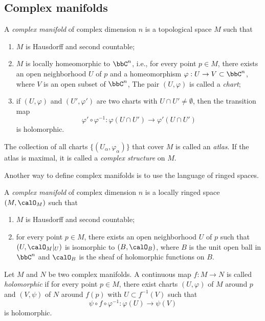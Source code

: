 
\subsection{Complex manifolds}

\begin{definition}\label{def:complex-manifold-by-altas}
	A \emph{complex manifold} of complex dimension \(n\) is a topological space \(M\) such that
	\begin{enumerate}
		\item \(M\) is Hausdorff and second countable;
		\item \(M\) is locally homeomorphic to \(\bbC^n\), i.e., for every point \(p\in M\), there exists an open neighborhood \(U\) of \(p\) and a homeomorphism \(\varphi: U\to V\subset \bbC^n\), where \(V\) is an open subset of \(\bbC^n\),
		      The pair \((U,\varphi)\) is called a \emph{chart};
		\item if \((U,\varphi)\) and \((U',\varphi')\) are two charts with \(U\cap U'\neq \emptyset\), then the transition map
		      \[
			      \varphi'\circ \varphi^{-1}: \varphi(U\cap U')\to \varphi'(U\cap U')
		      \]
		      is holomorphic.
	\end{enumerate}
	The collection of all charts \(\{(U_\alpha,\varphi_\alpha)\}\) that cover \(M\) is called an \emph{atlas}.
	If the atlas is maximal, it is called a \emph{complex structure} on \(M\).
\end{definition}

Another way to define complex manifolds is to use the language of ringed spaces.

\begin{definition}\label{def:complex-manifold-as-ringed-space}
	A \emph{complex manifold} of complex dimension \(n\) is a locally ringed space \((M,\calO_M)\) such that
	\begin{enumerate}
		\item \(M\) is Hausdorff and second countable;
		\item for every point \(p\in M\), there exists an open neighborhood \(U\) of \(p\) such that \((U,\calO_M|_U)\) is isomorphic to \((B,\calO_B)\), where \(B\) is the unit open ball in \(\bbC^n\) and \(\calO_B\) is the sheaf of holomorphic functions on \(B\).
	\end{enumerate}
\end{definition}

\begin{definition}\label{def:holomorphic_map_between_complex_manifolds}
	Let \(M\) and \(N\) be two complex manifolds.
	A continuous map \(f: M\to N\) is called \emph{holomorphic} if for every point \(p\in M\), there exist charts \((U,\varphi)\) of \(M\) around \(p\) and \((V,\psi)\) of \(N\) around \(f(p)\) with \(U \subset f^{-1}(V)\) such that
	\[
		\psi\circ f\circ \varphi^{-1}: \varphi(U)\to \psi(V)
	\]
	is holomorphic.
\end{definition}


